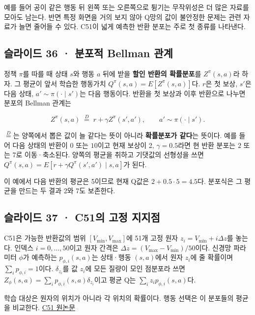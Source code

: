 \documentclass[11pt,a4paper]{article}
\begin{document}
예를 들어 공이 같은 행동 뒤 왼쪽 또는 오른쪽으로 튕기는 무작위성은 더 많은 자료를 모아도 남는다. 반면 특정 화면을 거의 보지 않아 Q망의 값이 불안정한 문제는 관련 자료가 늘면 줄어들 수 있다. C51이 넓게 예측한 반환 분포는 주로 첫 종류를 나타낸다.\par

\subsection{슬라이드 36 · 분포적 Bellman 관계}

정책 $\pi$를 따를 때 상태 $s$와 행동 $a$ 뒤에 받을 \textbf{할인 반환의 확률분포}를 $Z^\pi(s,a)$라 하자. 그 평균이 앞서 학습한 행동가치 $Q^\pi(s,a)=E[Z^\pi(s,a)]$다. $r$은 첫 보상, $s'$은 다음 상태, $a'\sim\pi(\cdot\mid s')$는 다음 행동이다. 반환을 첫 보상과 이후 반환으로 나누면 분포의 Bellman 관계는\par

\[
Z^\pi(s,a)\;\overset{D}{=}\;r+\gamma Z^\pi(s',a'),
\qquad a'\sim\pi(\cdot\mid s').
\]

$\overset D=$는 양쪽에서 뽑은 값이 늘 같다는 뜻이 아니라 \textbf{확률분포가 같다}는 뜻이다. 예를 들어 다음 상태의 반환이 $0$ 또는 $10$이고 현재 보상이 2, $\gamma=0.5$라면 현 반환 분포는 $2$ 또는 $7$로 이동·축소된다. 양쪽의 평균을 취하고 기댓값의 선형성을 쓰면 $Q^\pi(s,a)=E[r+\gamma Q^\pi(s',a')\mid s,a]$가 된다.\par

이 예에서 다음 반환의 평균은 5이므로 현재 Q값은 $2+0.5\cdot5=4.5$다. 분포식은 그 평균을 만드는 두 결과 2와 7도 보존한다.\par

\subsection{슬라이드 37 · C51의 고정 지지점}

C51은 가능한 반환값의 범위 $[V_{\min},V_{\max}]$에 51개 고정 원자 $z_i=V_{\min}+i\Delta z$를 놓는다. 인덱스 $i=0,\ldots,50$이고 원자 간격은 $\Delta z=(V_{\max}-V_{\min})/50$이다. 신경망 파라미터 $\phi$가 예측하는 $p_{\phi,i}(s,a)$는 상태·행동 $(s,a)$에서 원자 $z_i$에 줄 확률이며 $\sum_i p_{\phi,i}=1$이다. $\delta_{z_i}$를 값 $z_i$에 모든 질량이 모인 점분포라 쓰면 $Z_\phi(s,a)=\sum_i p_{\phi,i}(s,a)\delta_{z_i}$이고 평균 Q는 $\sum_i z_i p_{\phi,i}(s,a)$다.\par

학습 대상은 원자의 위치가 아니라 각 위치의 확률이다. 행동 선택은 이 분포들의 평균을 비교한다. \href{https://arxiv.org/abs/1707.06887}{C51 원논문}\par
\end{document}
